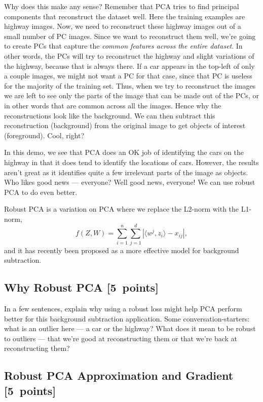 \documentclass{article}
\newcommand{\blu}[1]{{\textcolor{blu}{#1}}}
\let\ask\blu
\newcommand\pts[1]{\textcolor{pointscolour}{[#1~points]}}
\begin{document}
Why does this make any sense? Remember that PCA tries to find principal components that reconstruct the dataset well. Here the training examples are highway images. Now, we need to reconstruct these highway images out of a small number of PC images. Since we want to reconstruct them well, we're going to create PCs that capture the \emph{common features across the entire dataset}. In other words, the PCs will try to reconstruct the highway and slight variations of the highway, because that is always there. If a car appears in the top-left of only a couple images, we might not want a PC for that case, since that PC is useless for the majority of the training set. Thus, when we try to reconstruct the images we are left to see only the parts of the image that can be made out of the PCs, or in other words that are common across all the images. Hence why the reconstructions look like the background. We can then subtract this reconstruction (background) from the original image to get objects of interest (foreground). Cool, right?

In this demo, we see that PCA does an OK job of identifying the cars on the highway in that it does tend to identify the locations of cars. However, the results aren't great as it identifies quite a few irrelevant parts of the image as objects. Who likes good news --- everyone? Well good news, everyone! We can use robust PCA to do even better.

Robust PCA is a variation on PCA where we replace the L2-norm with the L1-norm,
\[
f(Z,W) = \sum_{i=1}^n\sum_{j=1}^d |\langle w^j, z_i\rangle - x_{ij}|,
\]
and it has recently been proposed as a more effective model for background subtraction.

\subsection{Why Robust PCA \pts{5}}

\ask{In a few sentences, explain why using a robust loss might help PCA perform better for this background subtraction application.} Some conversation-starters: what is an outlier here --- a car or the highway? What does it mean to be robust to outliers --- that we're good at reconstructing them or that we're back at reconstructing them?

\subsection{Robust PCA Approximation and Gradient \pts{5}}
\end{document}

